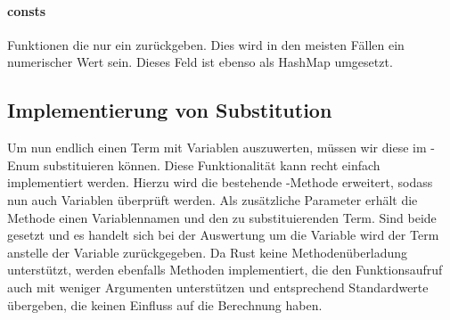 \documentclass[11pt,a4paper, ngerman]{article}
\begin{document}
\paragraph{consts} Funktionen die nur ein  zurückgeben. Dies wird in den meisten Fällen ein numerischer Wert sein. Dieses Feld ist ebenso als HashMap umgesetzt.

\subsection{Implementierung von Substitution} Um nun endlich einen Term mit Variablen auszuwerten, müssen wir diese im -Enum substituieren können. Diese Funktionalität kann recht einfach implementiert werden. Hierzu wird die bestehende -Methode erweitert, sodass nun auch Variablen überprüft werden. Als zusätzliche Parameter erhält die Methode einen Variablennamen und den zu substituierenden Term. Sind beide gesetzt und es handelt sich bei der Auswertung um die Variable wird der Term anstelle der Variable zurückgegeben. Da Rust keine Methodenüberladung unterstützt, werden ebenfalls Methoden implementiert, die den Funktionsaufruf auch mit weniger Argumenten unterstützen und entsprechend Standardwerte übergeben, die keinen Einfluss auf die Berechnung haben.
\end{document}
